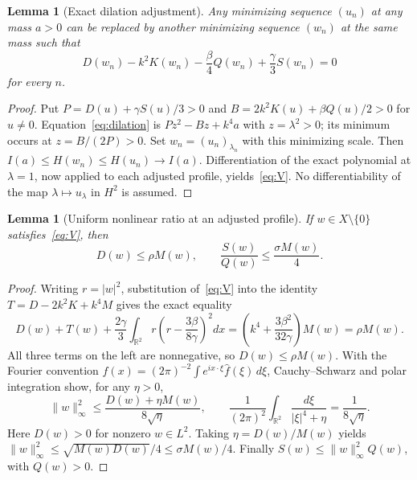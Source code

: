 \documentclass[11pt]{article}
\newtheorem{lemma}[theorem]{Lemma}
\newcommand{\RR}{\mathbb R}
\newcommand{\nm}[2]{\lVert #1\rVert_{#2}}
\begin{document}
\begin{lemma}[Exact dilation adjustment]\label{lem:dilation}
Any minimizing sequence \((u_n)\) at any mass \(a>0\) can be replaced
by another minimizing sequence \((w_n)\) at the same mass such that
\begin{equation}\label{eq:V}
D(w_n)-k^2K(w_n)-\frac\beta4Q(w_n)
+\frac\gamma3S(w_n)=0
\end{equation}
for every \(n\).
\end{lemma}
\begin{proof}
Put \(P=D(u)+\gamma S(u)/3>0\) and
\(B=2k^2K(u)+\beta Q(u)/2>0\) for \(u\ne0\).
Equation~\eqref{eq:dilation} is \(Pz^2-Bz+k^4a\)
with \(z=\lambda^2>0\); its minimum occurs at
\(z=B/(2P)>0\). Set \(w_n=(u_n)_{\lambda_n}\) with this
minimizing scale. Then
\(I(a)\le H(w_n)\le H(u_n)\to I(a)\).
Differentiation of the exact polynomial at \(\lambda=1\), now applied
to each adjusted profile, yields~\eqref{eq:V}.
No differentiability of the map \(\lambda\mapsto u_\lambda\) in \(H^2\)
is assumed.
\end{proof}

\begin{lemma}[Uniform nonlinear ratio at an adjusted profile]\label{lem:ratio}
If \(w\in X\setminus\{0\}\) satisfies~\eqref{eq:V}, then
\[
D(w)\le\rho M(w),\qquad
\frac{S(w)}{Q(w)}\le\frac{\sigma M(w)}4.
\]
\end{lemma}
\begin{proof}
Writing \(r=|w|^2\), substitution of~\eqref{eq:V} into the
identity \(T=D-2k^2K+k^4M\) gives the exact equality
\begin{equation}\label{eq:completed}
D(w)+T(w)+\frac{2\gamma}{3}
\int_{\RR^2}r\left(r-\frac{3\beta}{8\gamma}\right)^2dx
=\left(k^4+\frac{3\beta^2}{32\gamma}\right)M(w)=\rho M(w).
\end{equation}
All three terms on the left are nonnegative, so \(D(w)\le\rho M(w)\).
With the Fourier convention
\(f(x)=(2\pi)^{-2}\int e^{ix\cdot\xi}\widehat f(\xi)\,d\xi\),
Cauchy--Schwarz and polar integration show, for any \(\eta>0\),
\[
\nm{w}{\infty}^2\le
\frac{D(w)+\eta M(w)}{8\sqrt\eta},\qquad
\frac{1}{(2\pi)^2}\int_{\RR^2}\frac{d\xi}{|\xi|^4+\eta}
=\frac1{8\sqrt\eta}.
\]
Here \(D(w)>0\) for nonzero \(w\in L^2\).
Taking \(\eta=D(w)/M(w)\) yields
\(\nm{w}{\infty}^2\le\sqrt{M(w)D(w)}/4
\le\sigma M(w)/4\).
Finally \(S(w)\le\nm{w}{\infty}^2Q(w)\), with \(Q(w)>0\).
\end{proof}
\end{document}
